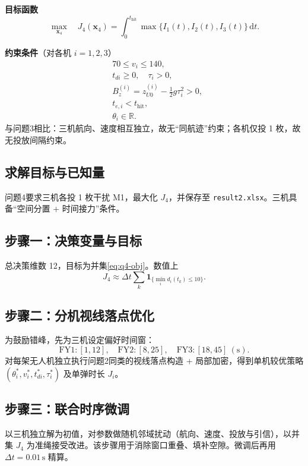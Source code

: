 \documentclass[withoutpreface,bwprint]{cumcmthesis}
\begin{document}
\textbf{目标函数}
\begin{equation}
\max_{\mathbf{x}_4}\quad
J_4(\mathbf{x}_4)
=\int_{0}^{t_{\mathrm{hit}}}
\max\{I_1(t),I_2(t),I_3(t)\}\,\mathrm{d}t.
\label{eq:q4-obj}
\end{equation}

\textbf{约束条件}（对各机 $i=1,2,3$）
\begin{equation}
\begin{aligned}
&70\le v_i\le 140,\\
&t_{di}\ge 0,\quad \tau_i>0,\\
&B^{(i)}_z=z_{U0}^{(i)}-\tfrac12 g\tau_i^2>0,\\
&t_{e,i}<t_{\mathrm{hit}},\\
&\theta_i\in\mathbb{R}.
\end{aligned}
\label{eq:q4-con}
\end{equation}
与问题3相比：三机航向、速度相互独立，故无“同航迹”约束；各机仅投 1 枚，故无投放间隔约束。

\subsection{求解目标与已知量}
问题4要求三机各投 1 枚干扰 M1，最大化 $J_4$，并保存至 \texttt{result2.xlsx}。三机具备“空间分置 + 时间接力”条件。

\subsection{步骤一：决策变量与目标}
总决策维数 12，目标为并集\eqref{eq:q4-obj}。数值上
\begin{equation}
J_4\approx\Delta t\sum_k\mathbf{1}_{\{\min_i d_i(t_k)\le 10\}}.
\label{eq:J4}
\end{equation}

\subsection{步骤二：分机视线落点优化}
为鼓励错峰，先为三机设定偏好时间窗：
\[
\mathrm{FY1}:[1,12],\quad
\mathrm{FY2}:[8,25],\quad
\mathrm{FY3}:[18,45]\ (\mathrm{s}).
\]
对每架无人机独立执行问题2同类的视线落点构造 + 局部加密，得到单机较优策略 $(\theta_i^\ast,v_i^\ast,t_{di}^\ast,\tau_i^\ast)$ 及单弹时长 $J_i$。

\subsection{步骤三：联合时序微调}
以三机独立解为初值，对参数做随机邻域扰动（航向、速度、投放与引信），以并集 $J_4$ 为准绳接受改进。该步骤用于消除窗口重叠、填补空隙。微调后再用 $\Delta t=0.01\,\mathrm{s}$ 精算。
\end{document}

